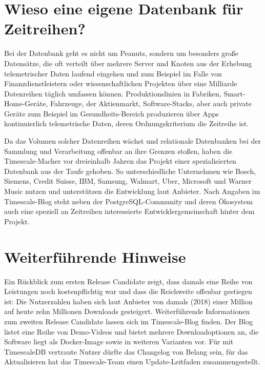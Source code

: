 	
	
\section{Wieso eine eigene Datenbank für Zeitreihen?}

Bei der Datenbank geht es nicht um Peanuts, sondern um besonders große Datensätze, die oft verteilt über mehrere Server und Knoten aus der Erhebung telemetrischer Daten laufend eingehen und zum Beispiel im Falle von Finanzdienstleistern oder wissenschaftlichen Projekten über eine Milliarde Datenreihen täglich umfassen können. Produktionslinien in Fabriken, Smart-Home-Geräte, Fahrzeuge, der Aktienmarkt, Software-Stacks, aber auch private Geräte zum Beispiel im Gesundheits-Bereich produzieren über Apps kontinuierlich telemetrische Daten, deren Ordnungskriterium die Zeitreihe ist.
	
Da das Volumen solcher Datenreihen wächst und relationale Datenbanken bei der Sammlung und Verarbeitung offenbar an ihre Grenzen stoßen, haben die Timescale-Macher vor dreieinhalb Jahren das Projekt einer spezialisierten Datenbank aus der Taufe gehoben. So unterschiedliche Unternehmen wie Bosch, Siemens, Credit Suisse, IBM, Samsung, Walmart, Uber, Microsoft und Warner Music nutzen und unterstützen die Entwicklung laut Anbieter. Nach Angaben im Timescale-Blog steht neben der PostgreSQL-Community und deren Ökosystem auch eine speziell an Zeitreihen interessierte Entwicklergemeinschaft hinter dem Projekt.

\section{Weiterführende Hinweise}


Ein Rückblick zum ersten Release Candidate zeigt, dass damals eine Reihe von Leistungen noch kostenpflichtig war und dass die Reichweite offenbar gestiegen ist: Die Nutzerzahlen haben sich laut Anbieter von damals (2018) einer Million auf heute zehn Millionen Downloads gesteigert. Weiterführende Informationen zum zweiten Release Candidate lassen sich im Timescale-Blog finden. Der Blog listet eine Reihe von Demo-Videos und bietet mehrere Downloadoptionen an, die Software liegt als Docker-Image sowie in weiteren Varianten vor. Für mit TimescaleDB vertraute Nutzer dürfte das Changelog von Belang sein, für das Aktualisieren hat das Timescale-Team einen Update-Leitfaden zusammengestellt.